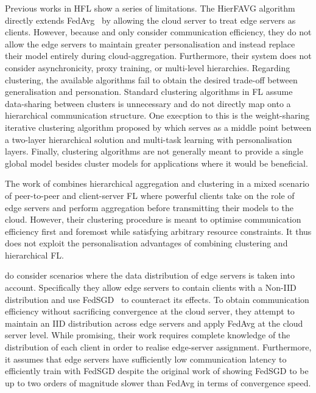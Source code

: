Previous works in HFL show a series of limitations. The HierFAVG algorithm directly extends FedAvg~\citep{FedAvg} by allowing the cloud server to treat edge servers as clients. However, because \citet{Client-Edge-CloudHierFL} and \citet{Hier_Het_Cellular} only consider communication efficiency, they do not allow the edge servers to maintain greater personalisation and instead replace their model entirely during cloud-aggregation. Furthermore, their system does not consider asynchronicity, proxy training, or multi-level hierarchies. Regarding clustering, the available algorithms fail to obtain the desired trade-off between generalisation and personation. Standard clustering algorithms in FL assume data-sharing between clusters is unnecessary and do not directly map onto a hierarchical communication structure. One execption to this is the weight-sharing iterative clustering algorithm proposed by \citet{AnEfficientFrameworkForClusteredFL} which serves as a middle point between a two-layer hierarchical solution and multi-task learning with personalisation layers. Finally, clustering algorithms are not generally meant to provide a single global model besides cluster models for applications where it would be beneficial.


The work of \citet{ResourceEfficientHierAgg} combines hierarchical aggregation and clustering in a mixed scenario of peer-to-peer and client-server FL where powerful clients take on the role of edge servers and perform aggregation before transmitting their models to the cloud. However, their clustering procedure is meant to optimise communication efficiency first and foremost while satisfying arbitrary resource constraints. It thus does not exploit the personalisation advantages of combining clustering and hierarchical FL\@.

\citet{OptimalUserEdgeAssingmentHierFL} do consider scenarios where the data distribution of edge servers is taken into account. Specifically they allow edge servers to contain clients with a Non-IID distribution and use FedSGD~\citep{FedAvg} to counteract its effects. To obtain communication efficiency without sacrificing convergence at the cloud server, they attempt to maintain an IID distribution across edge servers and apply FedAvg at the cloud server level. While promising, their work requires complete knowledge of the distribution of each client in order to realise edge-server assignment. Furthermore, it assumes that edge servers have sufficiently low communication latency to efficiently train with FedSGD despite the original work of \citet{FedAvg} showing FedSGD to be up to two orders of magnitude slower than FedAvg in terms of convergence speed.




